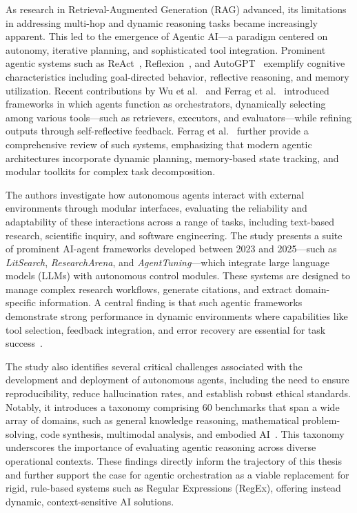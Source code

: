 \vspace{0.5cm}

As research in Retrieval-Augmented Generation (RAG) advanced, its limitations in addressing multi-hop and dynamic reasoning tasks became increasingly apparent. This led to the emergence of Agentic AI—a paradigm centered on autonomy, iterative planning, and sophisticated tool integration. Prominent agentic systems such as ReAct~\cite{react2022}, Reflexion~\cite{reflexion2023}, and AutoGPT~\cite{autogpt2023} exemplify cognitive characteristics including goal-directed behavior, reflective reasoning, and memory utilization. Recent contributions by Wu et al.~\cite{wu2025agents} and Ferrag et al.~\cite{ferrag2025can} introduced frameworks in which agents function as orchestrators, dynamically selecting among various tools—such as retrievers, executors, and evaluators—while refining outputs through self-reflective feedback. Ferrag et al.~\cite{ferrag2025can} further provide a comprehensive review of such systems, emphasizing that modern agentic architectures incorporate dynamic planning, memory-based state tracking, and modular toolkits for complex task decomposition.

\vspace{0.5cm}

The authors investigate how autonomous agents interact with external environments through modular interfaces, evaluating the reliability and adaptability of these interactions across a range of tasks, including text-based research, scientific inquiry, and software engineering. The study presents a suite of prominent AI-agent frameworks developed between 2023 and 2025—such as \textit{LitSearch}, \textit{ResearchArena}, and \textit{AgentTuning}—which integrate large language models (LLMs) with autonomous control modules. These systems are designed to manage complex research workflows, generate citations, and extract domain-specific information. A central finding is that such agentic frameworks demonstrate strong performance in dynamic environments where capabilities like tool selection, feedback integration, and error recovery are essential for task success~\cite{zeng2024agenttuning,kang2024researcharena}.

\vspace{0.5cm}

The study also identifies several critical challenges associated with the development and deployment of autonomous agents, including the need to ensure reproducibility, reduce hallucination rates, and establish robust ethical standards. Notably, it introduces a taxonomy comprising 60 benchmarks that span a wide array of domains, such as general knowledge reasoning, mathematical problem-solving, code synthesis, multimodal analysis, and embodied AI~\cite{ferrag2025can}. This taxonomy underscores the importance of evaluating agentic reasoning across diverse operational contexts. These findings directly inform the trajectory of this thesis and further support the case for agentic orchestration as a viable replacement for rigid, rule-based systems such as Regular Expressions (RegEx), offering instead dynamic, context-sensitive AI solutions.


